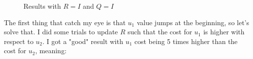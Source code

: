 \documentclass[10pt,a4paper]{article}
\begin{document}
	\begin{figure}[H]
			\centering
            \caption{Results with $R = I$ and $Q = I$}
            \label{fig:Q1-xu0}
	\end{figure}

The first thing that catch my eye is that $u_{1}$ value jumps at the beginning, so let's solve that. I did some trials to update $R$ such that the cost for $u_{1}$ is higher with respect to $u_{2}$. I got a "good" result with $u_1$ cost being 5 times higher than the cost for $u_{2}$, meaning:
\end{document}

